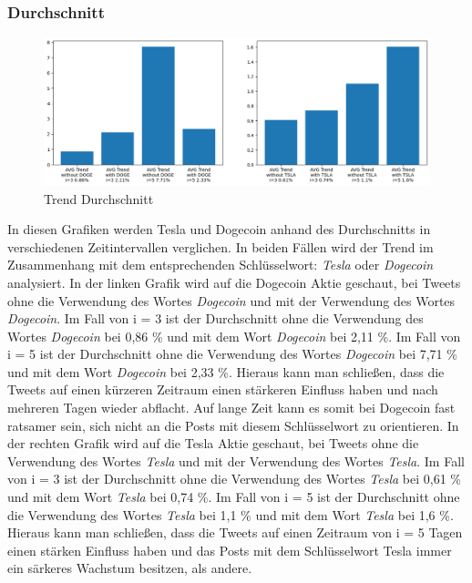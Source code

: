 \documentclass{article}
\begin{document}
\subsubsection{Durchschnitt} \label{Durchschnitt}
\begin{figure}[!htb]
  	\includegraphics[width=\textwidth, center]{../imgs/Trend_Durchschnitt.png}
 	\caption{Trend Durchschnitt}
 	\label{fig:Trend Durchschnitt}
\end{figure}
In diesen Grafiken werden Tesla und Dogecoin anhand des Durchschnitts in verschiedenen Zeitintervallen verglichen.
In beiden Fällen wird der Trend im Zusammenhang mit dem entsprechenden Schlüsselwort: \textit{Tesla} oder \textit{Dogecoin} analysiert.
In der linken Grafik wird auf die Dogecoin Aktie geschaut, bei Tweets ohne die Verwendung des Wortes \textit{Dogecoin} und mit der Verwendung des Wortes \textit{Dogecoin}.
Im Fall von i = 3 ist der Durchschnitt ohne die Verwendung des Wortes \textit{Dogecoin} bei 0,86 \% und mit dem Wort \textit{Dogecoin} bei 2,11 \%.
Im Fall von i = 5 ist der Durchschnitt ohne die Verwendung des Wortes \textit{Dogecoin} bei 7,71 \% und mit dem Wort \textit{Dogecoin} bei 2,33 \%.
Hieraus kann man schließen, dass die Tweets auf einen kürzeren Zeitraum einen stärkeren Einfluss haben und nach mehreren Tagen wieder abflacht.
Auf lange Zeit kann es somit bei Dogecoin fast ratsamer sein, sich nicht an die Posts mit diesem Schlüsselwort zu orientieren.
In der rechten Grafik wird auf die Tesla Aktie geschaut, bei Tweets ohne die Verwendung des Wortes \textit{Tesla} und mit der Verwendung des Wortes \textit{Tesla}.
Im Fall von i = 3 ist der Durchschnitt ohne die Verwendung des Wortes \textit{Tesla} bei 0,61 \% und mit dem Wort \textit{Tesla} bei 0,74 \%.
Im Fall von i = 5 ist der Durchschnitt ohne die Verwendung des Wortes \textit{Tesla} bei 1,1 \% und mit dem Wort \textit{Tesla} bei 1,6 \%.
Hieraus kann man schließen, dass die Tweets auf einen Zeitraum von i = 5 Tagen einen stärken Einfluss haben und das Posts mit dem Schlüsselwort Tesla immer ein särkeres Wachstum besitzen, als andere. 
\end{document}
